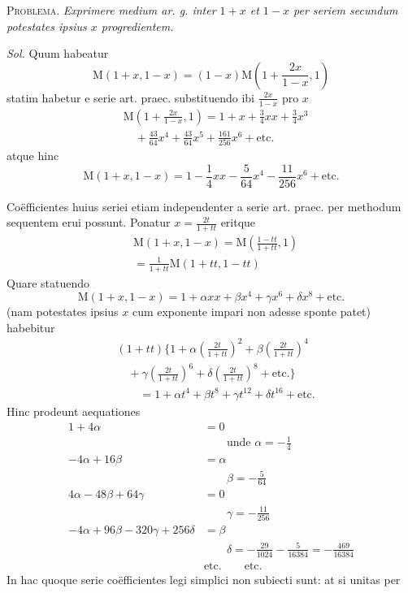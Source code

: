 
\textsc{Problema.} \textit{Exprimere medium ar. g. inter \(1+x\) et \(1-x\) per seriem secundum potestates ipsius \(x\) progredientem.}

\textit{Sol.} Quum habeatur
\[
\mathrm{M}(1+x,1-x)=(1-x)\mathrm{M}(1+\frac{2x}{1-x},1)
\]
statim habetur e serie art. praec. substituendo ibi \(\frac{2x}{1-x}\) pro \(x\)
\[
\begin{aligned}&\mathrm{M}(1+\frac{2x}{1-x},1)=1+x+\frac34xx+\frac34x^3\\&\quad+\frac{43}{64}x^4+\frac{43}{64}x^5+\frac{161}{256}x^6+\text{etc.}\end{aligned}
\]
atque hinc
\[
\mathrm{M}(1+x,1-x)=1-\frac14xx-\frac5{64}x^4-\frac{11}{256}x^6+\text{etc.}
\]

Co\"efficientes huius seriei etiam independenter a serie art. praec. per methodum sequentem erui possunt. Ponatur \(x=\frac{2t}{1+tt}\) eritque
\[
\begin{aligned}&\mathrm{M}(1+x,1-x)=\mathrm{M}(\frac{1-tt}{1+tt},1)\\&=\frac1{1+tt}\mathrm{M}(1+tt,1-tt)\end{aligned}
\]
Quare statuendo
\[
\mathrm{M}(1+x,1-x)=1+\alpha xx+\beta x^4+\gamma x^6+\delta x^8+\text{etc.}
\]
(nam potestates ipsius \(x\) cum exponente impari non adesse sponte patet) habebitur
\[
\begin{aligned}
&(1+tt)\{1+\alpha(\frac{2t}{1+tt})^2+\beta(\frac{2t}{1+tt})^4\\&\quad+\gamma(\frac{2t}{1+tt})^6+\delta(\frac{2t}{1+tt})^8+\text{etc.}\}\\[6pt]
&\qquad=1+\alpha t^4+\beta t^8+\gamma t^{12}+\delta t^{16}+\text{etc.}
\end{aligned}
\]
Hinc prodeunt aequationes
\[
\begin{aligned}
1+4\alpha&=0\\&\qquad\text{unde }\alpha=-\frac14\\[6pt]
-4\alpha+16\beta&=\alpha\\&\qquad\beta=-\frac5{64}\\[6pt]
4\alpha-48\beta+64\gamma&=0\\&\qquad\gamma=-\frac{11}{256}\\[6pt]
-4\alpha+96\beta-320\gamma+256\delta&=\beta\\&\qquad\delta=-\frac{29}{1024}-\frac5{16384}=-\frac{469}{16384}\\[6pt]
&\text{etc.}\qquad\text{etc.}
\end{aligned}
\]
In hac quoque serie co\"efficientes legi simplici non subiecti sunt: at si unitas per
